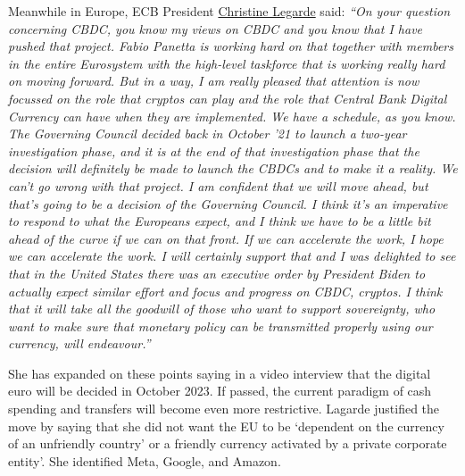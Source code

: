 Meanwhile in Europe, ECB President \href{https://www.ecb.europa.eu/press/pressconf/2022/html/ecb.is220310~1bc8c1b1ca.en.html#qa}{Christine Legarde} said: \textit{``On your question concerning CBDC, you know my views on CBDC and you know that I have pushed that project. Fabio Panetta is working hard on that together with members in the entire Eurosystem with the high-level taskforce that is working really hard on moving forward. But in a way, I am really pleased that attention is now focussed on the role that cryptos can play and the role that Central Bank Digital Currency can have when they are implemented. We have a schedule, as you know. The Governing Council decided back in October '21 to launch a two-year investigation phase, and it is at the end of that investigation phase that the decision will definitely be made to launch the CBDCs and to make it a reality. We can't go wrong with that project. I am confident that we will move ahead, but that's going to be a decision of the Governing Council. I think it's an imperative to respond to what the Europeans expect, and I think we have to be a little bit ahead of the curve if we can on that front. If we can accelerate the work, I hope we can accelerate the work. I will certainly support that and I was delighted to see that in the United States there was an executive order by President Biden to actually expect similar effort and focus and progress on CBDC, cryptos. I think that it will take all the goodwill of those who want to support sovereignty, who want to make sure that monetary policy can be transmitted properly using our currency, will endeavour.''}\par
She has expanded on these points saying in a video interview that the digital euro will be decided in October 2023. If passed, the current paradigm of cash spending and transfers will become even more restrictive. Lagarde justified the move by saying that she did not want the EU to be `dependent on the currency of an unfriendly country' or a friendly currency activated by a private corporate entity'. She identified Meta, Google, and Amazon.\par

